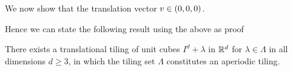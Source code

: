 \documentclass[../thesis.tex]{subfiles}
\begin{document}
We now show that the translation vector $v\in (0,0,0)$. 



Hence we can state the following result using the above as proof

\begin{theorem}
    There exists a translational tiling of unit cubes $I^d + \lambda$ in $\mathbb{R}^d$ for $\lambda\in \Lambda$ in all dimensions $d\geq3$, in which the tiling set $\Lambda$ constitutes an aperiodic tiling. 
\end{theorem}
\end{document}
